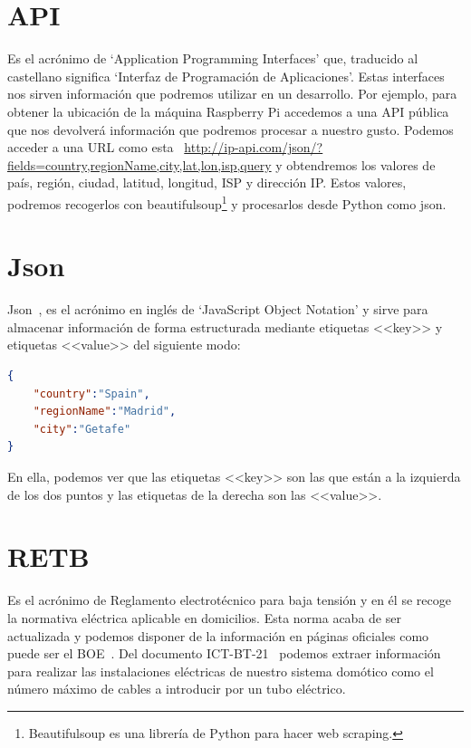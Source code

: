 \section{API}\label{concepto:API}
Es el acrónimo de ‘Application Programming Interfaces’ que, traducido al castellano significa ‘Interfaz de Programación de Aplicaciones’. Estas interfaces nos sirven información que podremos utilizar en un desarrollo.
Por ejemplo, para obtener la ubicación de la máquina Raspberry Pi accedemos a una API pública que nos devolverá información que podremos procesar a nuestro gusto.
Podemos acceder a una URL como esta ~\url{http://ip-api.com/json/?fields=country,regionName,city,lat,lon,isp,query} y obtendremos los valores de país, región, ciudad, latitud, longitud, ISP y dirección IP.
Estos valores, podremos recogerlos con beautifulsoup\footnote{Beautifulsoup es una librería de Python para hacer web scraping.} y procesarlos desde Python como json.

\section{Json}\label{concepto:JSON}
{Json~\cite{misc:Json}}, es el acrónimo en inglés de ‘JavaScript Object Notation’ y sirve para almacenar información de forma estructurada mediante etiquetas <<key>> y etiquetas <<value>> del siguiente modo:

\begin{lstlisting}[language=json,firstnumber=1]
{
    "country":"Spain", 
    "regionName":"Madrid", 
    "city":"Getafe"
}
\end{lstlisting}


En ella, podemos ver que las etiquetas <<key>> son las que están a la izquierda de los dos puntos y las etiquetas de la derecha son las <<value>>.

\section{RETB}\label{concepto:RETB}
Es el acrónimo de Reglamento electrotécnico para baja tensión y en él se recoge la normativa eléctrica aplicable en domicilios.
Esta norma acaba de ser actualizada y podemos disponer de la información en páginas oficiales como puede ser el BOE~\cite{manual:REBT}.
Del documento ICT-BT-21~\cite{manual:ICT-BT-21} podemos extraer información para realizar las instalaciones eléctricas de nuestro sistema domótico como el número máximo de cables a introducir por un tubo eléctrico.

